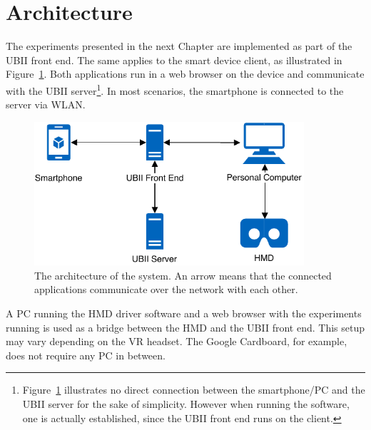 \section{Architecture}\label{section:architecture}

The experiments presented in the next Chapter are implemented as part of the \ac{UBII} front end. The same applies to the smart device client, as illustrated in Figure~\ref{fig:architecture}. Both applications run in a web browser on the device and communicate with the \ac{UBII} server\footnote{Figure~\ref{fig:architecture} illustrates no direct connection between the smartphone/\ac{PC} and the \ac{UBII} server for the sake of simplicity. However when running the software, one is actually established, since the \ac{UBII} front end runs on the client.}. In most scenarios, the smartphone is connected to the server via \ac{WLAN}.

\begin{figure}[H]
  \centering
  \includegraphics[width=10cm]{figures/implementation/architecture.pdf}
  \caption[The architecture of the system.]{The architecture of the system. An arrow means that the connected applications communicate over the network with each other.}\label{fig:architecture}
\end{figure}

A \ac{PC} running the \ac{HMD} driver software and a web browser with the experiments running is used as a bridge between the \ac{HMD} and the \ac{UBII} front end. This setup may vary depending on the \ac{VR} headset. The Google Cardboard, for example, does not require any \ac{PC} in between.

